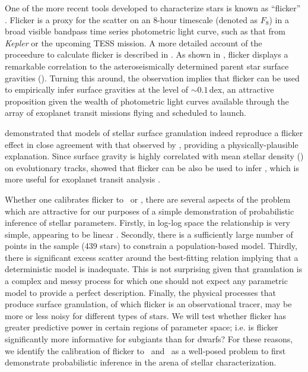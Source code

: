 

One of the more recent tools developed to characterize stars is known as
``flicker'' \citep{Bastien2013}.
Flicker is a proxy for the scatter on an 8-hour timescale (denoted as $F_8$)
in a broad visible bandpass time series photometric light curve, such as that
from \textit{Kepler} or the upcoming TESS mission. A more detailed account of
the proceedure to calculate flicker is described in \citet{Bastien2013}. As
shown in \citet{Bastien2013}, flicker displays a remarkable correlation to
the asteroseismically determined parent star surface gravities (\logg).
Turning this around, the observation implies that flicker can be used to
empirically infer surface gravities at the level of $\sim0.1$\,dex, an
attractive proposition given the wealth of photometric light curves available
through the array of exoplanet transit missions flying and scheduled to
launch.

\citet{Cranmer2014} demonstrated that models of stellar surface granulation
indeed reproduce a flicker effect in close agreement with that observed by
\citet{Bastien2013}, providing a physically-plausible explanation.
Since surface gravity is highly correlated with mean stellar density (\rhostar)
on evolutionary tracks, \citet{Kipping2014} showed that flicker can be also
be used to infer \rhostar, which is more useful for exoplanet transit analysis
\citep{Seager2003}.

Whether one calibrates flicker to \logg\ or \rhostar, there are several aspects
of the problem which are attractive for our purposes of a simple demonstration
of probabilistic inference of stellar parameters.
Firstly, in log-log space the relationship is very simple, appearing to be
linear \citep{Kipping2014}.
Secondly, there is a sufficiently large number of points in the sample (439
stars) to constrain a population-based model.
Thirdly, there is significant excess scatter around the best-fitting relation
implying that a deterministic model is inadequate.
This is not surprising given that granulation is a complex and messy process
for which one should not expect any parametric model to provide a perfect
description.
Finally, the physical processes that produce surface granulation, of which
flicker is an observational tracer, may be more or less noisy for different
types of stars.
We will test whether flicker has greater predictive power in certain regions
of parameter space; i.e. is flicker significantly more informative for
subgiants than for dwarfs?
For these reasons, we identify the calibration of
flicker to \logg\ and \rhostar\ as a well-posed problem to first demonstrate
probabilistic inference in the arena of stellar characterization.

